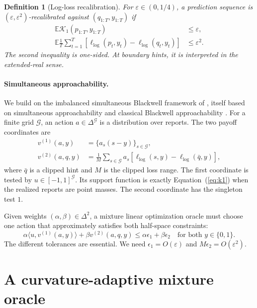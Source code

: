 \documentclass{article}
\newtheorem{definition}{Definition}
\newcommand{\calK}{\mathcal{K}}
\newcommand{\simplex}{\Delta}
\begin{document}
\begin{definition}[Log-loss recalibration]
For $\varepsilon\in(0,1/4)$, a prediction sequence is $(\varepsilon,\varepsilon^2)$-recalibrated against $(q_{1:T},y_{1:T})$ if
\begin{align}
  \mathbb{E}\calK_1(p_{1:T},y_{1:T})&\leq\varepsilon,
  \label{eq:target-cal}\\
  \mathbb{E}\frac1T\sum_{t=1}^T
  [\ell_{\log}(p_t,y_t)-\ell_{\log}(q_t,y_t)]
  &\leq\varepsilon^2.
  \label{eq:target-loss}
\end{align}
The second inequality is one-sided. At boundary hints, it is interpreted in the extended-real sense.
\end{definition}

\paragraph{Simultaneous approachability.}
We build on the imbalanced simultaneous Blackwell framework of \citet{hu2026optimal}, itself based on simultaneous approachability \citep{hu2026simultaneous} and classical Blackwell approachability \citep{blackwell1956analog}. For a finite grid $\mathcal G$, an action $a\in\simplex^{\mathcal G}$ is a distribution over reports. The two payoff coordinates are
\begin{align}
 v^{(1)}(a,y)&=\{a_s(s-y)\}_{s\in\mathcal G},
 \label{eq:cal-payoff}\\
 v^{(2)}(a,q,y)&=\frac1M\sum_{s\in\mathcal G}a_s
 [\ell_{\log}(s,y)-\ell_{\log}(\bar q,y)],
 \label{eq:loss-payoff}
\end{align}
where $\bar q$ is a clipped hint and $M$ is the clipped loss range. The first coordinate is tested by $u\in[-1,1]^{\mathcal G}$. Its support function is exactly Equation~(\ref{eq:k1}) when the realized reports are point masses. The second coordinate has the singleton test $1$.

Given weights $(\alpha,\beta)\in\simplex^2$, a mixture linear optimization oracle must choose one action that approximately satisfies both half-space constraints:
\begin{equation}
 \alpha\langle u,v^{(1)}(a,y)\rangle
 +\beta v^{(2)}(a,q,y)
 \leq\alpha\epsilon_1+\beta\epsilon_2
 \quad\text{for both }y\in\{0,1\}.
 \label{eq:mloo-goal}
\end{equation}
The different tolerances are essential. We need $\epsilon_1=O(\varepsilon)$ and $M\epsilon_2=O(\varepsilon^2)$.

\section{A curvature-adaptive mixture oracle}
\label{sec:oracle}
\end{document}
